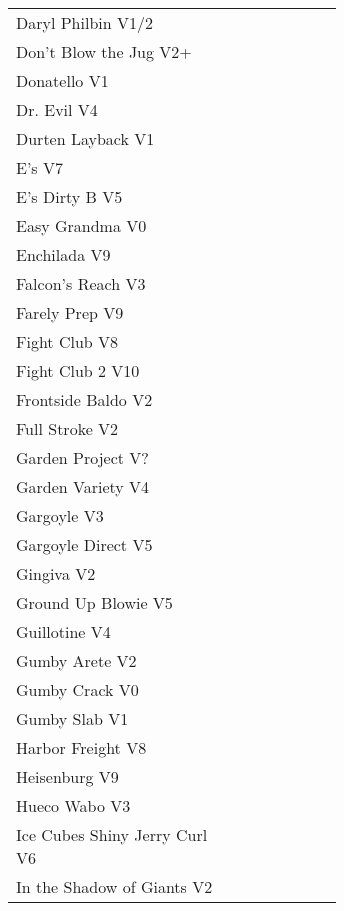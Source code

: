 \begin{flushleft}
\begin{center}
\begin{supertabular}{p{0.65\linewidth}r}
Daryl Philbin V1/2 & \pageref{rt:Daryl Philbin} \\
Don't Blow the Jug V2+ & \pageref{rt:Don't Blow the Jug} \\
Donatello V1 & \pageref{rt:Donatello} \\
Dr. Evil V4 & \pageref{rt:Dr. Evil} \\
Durten Layback V1 & \pageref{rt:Durten Layback} \\
E's V7 & \pageref{rt:E's} \\
E's Dirty B V5 & \pageref{rt:E's Dirty B} \\
Easy Grandma V0 & \pageref{rt:Easy Grandma} \\
Enchilada V9 & \pageref{rt:Enchilada} \\
Falcon's Reach V3 & \pageref{rt:Falcon's Reach} \\
Farely Prep V9 & \pageref{rt:Farely Prep} \\
Fight Club V8 & \pageref{rt:Fight Club} \\
Fight Club 2 V10 & \pageref{rt:Fight Club 2} \\
Frontside Baldo V2 & \pageref{rt:Frontside Baldo} \\
Full Stroke V2 & \pageref{rt:Full Stroke} \\
Garden Project V? & \pageref{rt:Garden Project} \\
Garden Variety V4 & \pageref{rt:Garden Variety} \\
Gargoyle V3 & \pageref{rt:Gargoyle} \\
Gargoyle Direct V5 & \pageref{vr:Gargoyle Direct} \\
Gingiva V2 & \pageref{rt:Gingiva} \\
Ground Up Blowie V5 & \pageref{rt:Ground Up Blowie} \\
Guillotine V4 & \pageref{rt:Guillotine} \\
Gumby Arete V2 & \pageref{rt:Gumby Arete} \\
Gumby Crack V0 & \pageref{rt:Gumby Crack} \\
Gumby Slab V1 & \pageref{rt:Gumby Slab} \\
Harbor Freight V8 & \pageref{vr:Harbor Freight} \\
Heisenburg V9 & \pageref{rt:Heisenburg} \\
Hueco Wabo V3 & \pageref{rt:Hueco Wabo} \\
Ice Cubes Shiny Jerry Curl V6 & \pageref{rt:Ice Cubes Shiny Jerry Curl} \\
In the Shadow of Giants V2 & \pageref{rt:In the Shadow of Giants} \\

\end{supertabular}
\end{center}
\end{flushleft}
